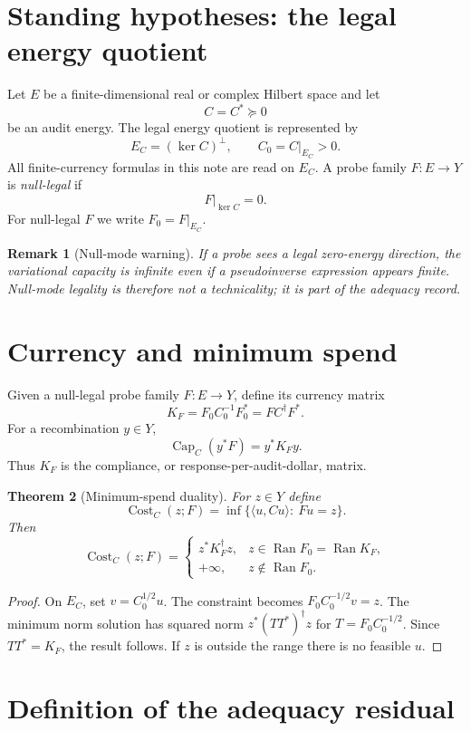 \documentclass[11pt]{article}
\newtheorem{theorem}{Theorem}[section]
\newtheorem{remark}[theorem]{Remark}
\newcommand{\Ran}{\operatorname{Ran}}
\newcommand{\Capacity}{\operatorname{Cap}}
\providecommand{\Cost}{\operatorname{Cost}}
\begin{document}
\section{Standing hypotheses: the legal energy quotient}

Let $E$ be a finite-dimensional real or complex Hilbert space and let
\[
C=C^*\succeq 0
\]
be an audit energy.  The legal energy quotient is represented by
\[
E_C=(\ker C)^\perp,
\qquad
C_0=C|_{E_C}>0.
\]
All finite-currency formulas in this note are read on $E_C$.  A probe family $F:E\to Y$ is \emph{null-legal} if
\[
F|_{\ker C}=0.
\]
For null-legal $F$ we write $F_0=F|_{E_C}$.

\begin{remark}[Null-mode warning]
If a probe sees a legal zero-energy direction, the variational capacity is infinite even if a pseudoinverse expression appears finite.  Null-mode legality is therefore not a technicality; it is part of the adequacy record.
\end{remark}

\section{Currency and minimum spend}

Given a null-legal probe family $F:E\to Y$, define its currency matrix
\[
K_F=F_0C_0^{-1}F_0^*=FC^\dagger F^*.
\]
For a recombination $y\in Y$,
\[
\Capacity_C(y^*F)=y^*K_Fy.
\]
Thus $K_F$ is the compliance, or response-per-audit-dollar, matrix.

\begin{theorem}[Minimum-spend duality]
For $z\in Y$ define
\[
\Cost_C(z;F)=\inf\{\langle u,Cu\rangle:\ Fu=z\}.
\]
Then
\[
\Cost_C(z;F)=
\begin{cases}
 z^*K_F^\dagger z,& z\in \Ran F_0=\Ran K_F,\\
 +\infty,& z\notin\Ran F_0.
\end{cases}
\]
\end{theorem}

\begin{proof}
On $E_C$, set $v=C_0^{1/2}u$.  The constraint becomes $F_0C_0^{-1/2}v=z$.  The minimum norm solution has squared norm $z^*(TT^*)^\dagger z$ for $T=F_0C_0^{-1/2}$.  Since $TT^*=K_F$, the result follows.  If $z$ is outside the range there is no feasible $u$.
\end{proof}

\section{Definition of the adequacy residual}
\end{document}
